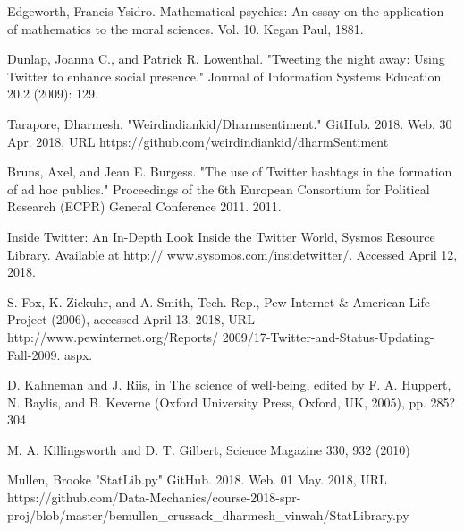 \documentclass[journal, a4paper]{IEEEtran}
\begin{document}
\begin{thebibliography}{5}
   Edgeworth, Francis Ysidro. Mathematical psychics: An essay on the application of mathematics to the moral sciences. Vol. 10. Kegan Paul, 1881.
   
   Dunlap, Joanna C., and Patrick R. Lowenthal. "Tweeting the night away: Using Twitter to enhance social presence." Journal of Information Systems Education 20.2 (2009): 129.
   
   Tarapore, Dharmesh. "Weirdindiankid/Dharmsentiment." GitHub. 2018. Web. 30 Apr. 2018, URL https://github.com/weirdindiankid/dharmSentiment
   
   Bruns, Axel, and Jean E. Burgess. "The use of Twitter hashtags in the formation of ad hoc publics." Proceedings of the 6th European Consortium for Political Research (ECPR) General Conference 2011. 2011.
   
   Inside Twitter: An In-Depth Look Inside the Twitter World, Sysmos Resource Library. Available at http:// www.sysomos.com/insidetwitter/. Accessed April 12, 2018.
   
   S. Fox, K. Zickuhr, and A. Smith, Tech. Rep., Pew Internet \& American Life Project (2006), accessed April 13, 2018, URL http://www.pewinternet.org/Reports/
2009/17-Twitter-and-Status-Updating-Fall-2009.
aspx.
   
   D. Kahneman and J. Riis, in The science of well-being,
edited by F. A. Huppert, N. Baylis, and B. Keverne
(Oxford University Press, Oxford, UK, 2005), pp. 285?
304
   
   M. A. Killingsworth and D. T. Gilbert, Science Magazine
   330, 932 (2010)
   
   Mullen, Brooke "StatLib.py" GitHub. 2018. Web. 01 May. 2018, URL https://github.com/Data-Mechanics/course-2018-spr-proj/blob/master/bemullen\_crussack\_dharmesh\_vinwah/StatLibrary.py

\end{thebibliography}

\end{document}
